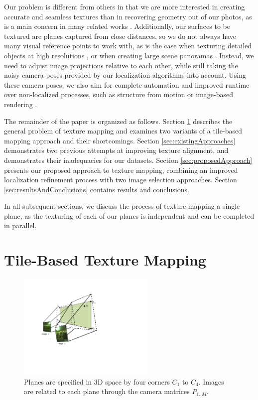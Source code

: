 \documentclass[10pt,twocolumn,letterpaper]{article}
\begin{document}
Our problem is different from others in that we are more interested in
creating accurate and seamless textures than in recovering geometry
out of our photos, as is a main concern in many related works
\cite{bernardinimultiplescans, debevechybrid,
  liu2010indoor}. Additionally, our surfaces to be textured are planes
captured from close distances, so we do not always have many visual
reference points to work with, as is the case when texturing detailed objects
at high resolutions \cite{bernardinimultiplescans, wangmultipleviews}, or when creating
large scene panoramas \cite{agarwalapanoramas, bernardinimultiplescans,
  debevecviewdependent}. Instead, we need to adjust image projections
relative to each other, while still taking the noisy camera
poses provided by our localization algorithms into account. Using these camera
poses, we also aim for complete automation and improved runtime over
non-localized processes, such as structure from motion or image-based
rendering \cite{agarwalapanoramas, debevechybrid,
  snavelyphototourism}.

The remainder of the paper is organized as follows. Section
\ref{sec:simpleTextureMapping} describes the general problem of
texture mapping and examines two variants of a tile-based mapping
approach and their shortcomings.  Section \ref{sec:existingApproaches}
demonstrates two previous attempts at improving texture alignment, and
demonstrates their inadequacies for our datasets. Section
\ref{sec:proposedApproach} presents our proposed approach to texture
mapping, combining an improved localization refinement process with
two image selection approaches. Section
\ref{sec:resultsAndConclusions} contains results and conclusions.

In all subsequent sections, we discuss the process of texture mapping
a single plane, as the texturing of each of our planes is independent
and can be completed in parallel.

\section{Tile-Based Texture Mapping}
\label{sec:simpleTextureMapping}
\begin{figure}
  \centering
  \includegraphics[height=2in]{Projection.pdf}
  \caption{Planes are specified in 3D space by four corners $C_1$ to
    $C_4$. Images are related to each plane through the camera
    matrices $P_{1..M}$. }
  \label{fig:projection}
\end{figure}
\end{document}
